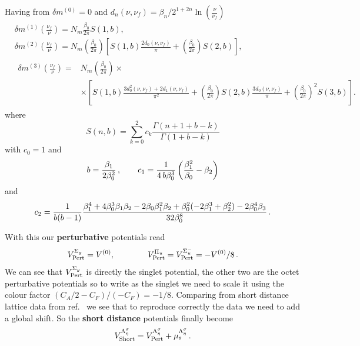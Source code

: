 \documentclass[11pt, a4paper]{article}
\begin{document}
Having from \cite{Pineda:2013lta} $\delta m^{(0)}=0$ and 
$d_n(\nu,\nu_f)=\beta_n/2^{1+2n}\ln\left(\frac{\nu}{\nu_f}\right)$
\begin{equation}
\begin{split}
&
\delta m^{(1)}(\frac{\nu_f}{\nu})= N_m
\frac{\beta_{0}}{2\pi} S(1,b), \\
&
\delta m^{(2)}(\frac{\nu_f}{\nu})= N_m\left(\frac{\beta_{0}}{2\pi}\right)
\left[ S(1,b)
\frac{2d_{0}(\nu,\nu_{f})}{\pi} + \left(\frac{\beta_{0}}{2\pi}\right) S(2,b)
\right], \\
&
\begin{split}
\delta m^{(3)}(\frac{\nu_f}{\nu}) =& N_m \left(\frac{\beta_{0}}{2\pi}\right)\times \\
&
\times \left[ 
S(1,b) \frac{3d_{0}^{2}(\nu,\nu_{f})+2d_{1}(\nu,\nu_{f})}{\pi^{2}} +
\left(\frac{\beta_{0}}{2\pi}\right) S(2,b) \frac{3d_{0}(\nu,\nu_{f})}{\pi} +
\left(\frac{\beta_{0}}{2\pi}\right)^{2} S(3,b) \right].
\end{split}
\end{split}
\end{equation}
where
\begin{equation}
S(n,b)=\sum_{k=0}^2c_k\frac{\Gamma(n+1+b-k)}{\Gamma(1+b-k)}
\end{equation}
with $c_0=1$ and 
\begin{equation}
b={\beta_1 \over 2\beta_0^2}\,,
\qquad
c_1={1 \over 4\,b\beta_0^3}\left({\beta_1^2 \over \beta_0}-\beta_2\right)
\end{equation}
and 
\begin{equation}
c_2={1 \over b(b-1)}
{\beta_1^4 + 4 \beta_0^3 \beta_1 \beta_2 - 2 \beta_0 \beta_1^2 \beta_2 + 
   \beta_0^2 (-2 \beta_1^3 + \beta_2^2) - 2 \beta_0^4 \beta_3 
\over 32 \beta_0^8}
\,.
\end{equation}



With this our \textbf{perturbative} potentials read
\begin{equation}
 V^{\Sigma_g}_{\rm Pert}=V^{(0)},
\qquad \qquad
V^{\Pi_u}_{\rm Pert}=V^{\Sigma_u^-}_{\rm Pert}=-V^{(0)}/8 \, .
\end{equation}
We can see that $V^{\Sigma_g}_{\rm Pert}$ is directly the singlet potential, the other two are the octet perturbative potentials so to write as the singlet we need to scale it using the colour factor $(C_A/2 - C_F)/(-C_F) = -1/8$.
Comparing from short distance lattice data from ref.~\cite{Schlosser:2025tca} we see that to reproduce correctly the data we need to add a global shift. So the \textbf{short distance} potentials finally become
\begin{equation}
    V^{\Lambda_\eta^\sigma}_{\rm Short} = V^{\Lambda_\eta^\sigma}_{\rm Pert} + \mu^{\Lambda_\eta^\sigma}_s \, .
\end{equation}
\end{document}
